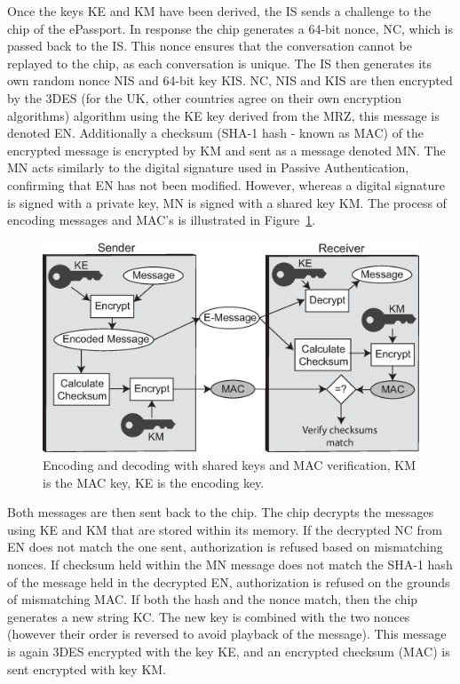 \documentclass[12pt]{article}
\begin{document}
Once the keys KE and KM have been derived, the IS sends a challenge to the chip of the ePassport. In response the chip generates a 64-bit nonce, NC, which is passed back to the IS. This nonce ensures that the conversation cannot be replayed to the chip, as each conversation is unique. The IS then generates its own random nonce NIS and 64-bit key KIS. NC, NIS and KIS are then encrypted by the 3DES (for the UK, other countries agree on their own encryption algorithms) algorithm using the KE key derived from the MRZ, this message is denoted EN. Additionally a checksum (SHA-1 hash - known as MAC) of the encrypted message is encrypted by KM and sent as a message denoted MN. The MN acts similarly to the digital signature used in Passive Authentication, confirming that EN has not been modified. However, whereas a digital signature is signed with a private key, MN is signed with a shared key KM. The process of encoding messages and MAC's is illustrated in Figure~\ref{fig:MACencoding}.

\begin{figure}
\centering
\includegraphics[width=5.5in]{MAC.eps}
\caption{Encoding and decoding with shared keys and MAC verification, KM is the MAC key, KE is the encoding key.}
\label{fig:MACencoding}
\end{figure}

Both messages are then sent back to the chip. The chip decrypts the messages using KE and KM that are stored within its memory. If the decrypted NC from EN does not match the one sent, authorization is refused based on mismatching nonces. If checksum held within the MN message does not match the SHA-1 hash of the message held in the decrypted EN, authorization is refused on the grounds of mismatching MAC. If both the hash and the nonce match, then the chip generates a new string KC. The new key is combined with the two nonces (however their order is reversed to avoid playback of the message). This message is again 3DES encrypted with the key KE, and an encrypted checksum (MAC) is sent encrypted with key KM. 
\end{document}

